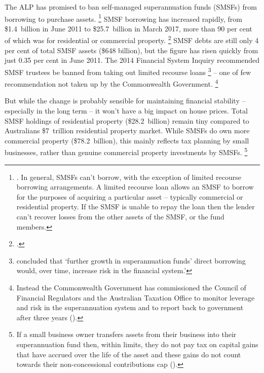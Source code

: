 The ALP has promised to ban self-managed superannuation funds (SMSFs) from borrowing to purchase assets.%
    \footnote{\textcite[][2--3]{ALP-2017-Housing-plan}. In general, SMSFs can’t borrow, with the exception of limited recourse borrowing arrangements. A limited recourse loan allows an SMSF to borrow for the purposes of acquiring a particular asset -- typically commercial or residential property. If the SMSF is unable to repay the loan then the lender can’t recover losses from the other assets of the SMSF, or the fund members.}
SMSF borrowing has increased rapidly, from \$1.4~billion in June 2011 to \$25.7~billion in March 2017, more than 90 per cent of which was for residential or commercial property.%
    \footcites{ATO-SMSF-report-March-2017}{Coorey2017-AFR-housing}
SMSF debts are still only 4 per cent of total SMSF assets (\$648 billion), but the figure has risen quickly from just 0.35 per cent in June 2011.
The 2014 Financial System Inquiry recommended SMSF trustees be banned from taking out limited recourse loans%
    \footnote{\textcite[][84]{FinancialSystemsInquiry2014} concluded that `further growth in superannuation funds' direct borrowing would, over time, increase risk in the financial system.'}
-- one of few recommendation not taken up by the Commonwealth Government.%
    \footnote{Instead the Commonwealth Government has commissioned the Council of Financial Regulators and the Australian Taxation Office to monitor leverage and risk in the superannuation system and to report back to government after three years (\textcite{CW-2015-Govt-response-FSI}).}
 
But while the change is probably sensible for maintaining financial stability -- especially in the long term -- it won’t have a big impact on house prices.
Total SMSF holdings of residential property (\$28.2~billion) remain tiny compared to Australians \$7~trillion residential property market. While SMSFs do own more commercial property (\$78.2~billion), this mainly reflects tax planning by small businesses, rather than genuine commercial property investments by SMSFs.%
	\footnote{If a small business owner transfers assets from their business into their superannuation fund then, within limits, they do not pay tax on capital gains that have accrued over the life of the asset and these gains do not count towards their non-concessional contributions cap (\textcite[][57]{DaleyCoatesWood-2015-Super-tax-targeting}).}








